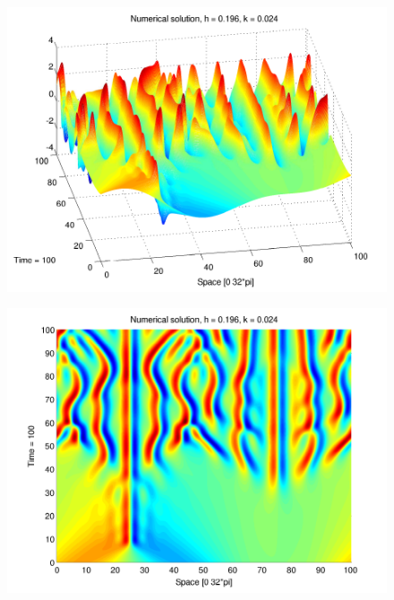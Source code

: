\documentclass[screen]{beamer}
\begin{document}
\begin{frame}

\begin{figure}[htb]
\includegraphics[width=1\textwidth]{KS_plot_surface.pdf}
\end{figure}

\end{frame}


\begin{frame}

\begin{figure}[htb]
\includegraphics[width=1\textwidth]{KS_plot_contour.pdf}
\end{figure}

\end{frame}
\end{document}
